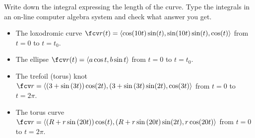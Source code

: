 Write down the integral expressing the length of the curve. Type the integrals in an on-line computer algebra system and check what answer you get.

\begin{itemize}
\item The loxodromic curve $\fcv r(t)= \langle \cos (10t) \sin (t), \sin (10t)\sin (t), \cos (t) \rangle$ from $t=0$ to $t=t_0$.
\item The ellipse $\fcv r(t) = \langle a\cos t, b\sin t \rangle $ from $t=0$ to $t=t_0$.
\item The trefoil (torus) knot
$\fcv r=\langle \left( 3+\sin \left(3t\right)\right) \cos (2t) ,(3+\sin \left( 3t \right) \sin (2t) ,\cos (3t)\rangle 
$
from $t=0$ to $t=2\pi$.
\item The torus curve
$\fcv r=\langle \left( R+r\sin \left(20t\right)\right) \cos (t) ,(R+r\sin \left( 20t \right) \sin (2t) ,r\cos (20t)\rangle 
$
from $t=0$ to $t=2\pi$.
\end{itemize}